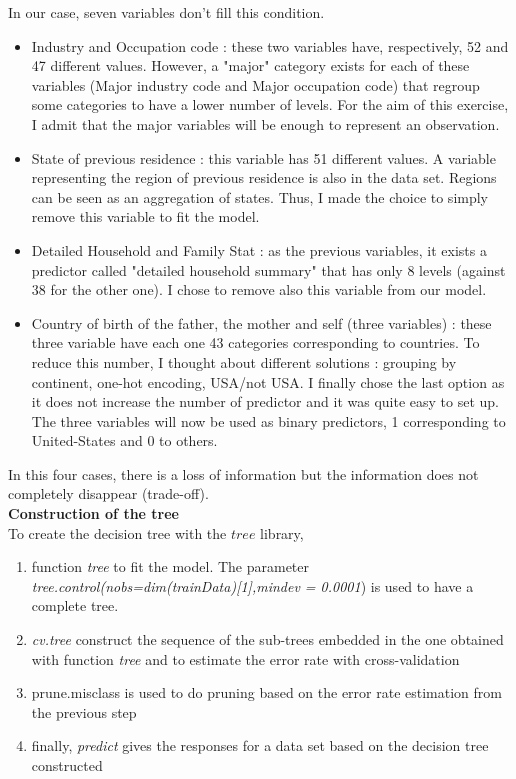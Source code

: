 \documentclass{article}
\begin{document}
\noindent In our case, seven variables don't fill this condition.
\begin{itemize}
    \item Industry and Occupation code : these two variables have, respectively, 52 and 47 different values. However, a "major" category exists for each of these variables (Major industry code and Major occupation code) that regroup some categories to have a lower number of levels. For the aim of this exercise, I admit that the major variables will be enough to represent an observation.
    \item State of previous residence : this variable has 51 different values. A variable representing the region of previous residence is also in the data set. Regions can be seen as an aggregation of states. Thus, I made the choice to simply remove this variable to fit the model. 
    \item Detailed Household and Family Stat : as the previous variables, it exists a predictor called "detailed household summary" that has only 8 levels (against 38 for the other one). I chose to remove also this variable from our model.
    \item Country of birth of the father, the mother and self (three variables) : these three variable have each one 43 categories corresponding to countries. To reduce this number, I thought about different solutions : grouping by continent, one-hot encoding, USA/not USA. I finally chose the last option as it does not increase the number of predictor and it was quite easy to set up. The three variables will now be used as binary predictors, 1 corresponding to United-States and 0 to others.
\end{itemize}

\noindent In this four cases, there is a loss of information but the information does not completely disappear (trade-off). \\

\noindent\textbf{Construction of the tree} \\

\noindent To create the decision tree with the $tree$ library, 
\begin{enumerate}
    \item function \textit{tree} to fit the model. The parameter \textit{tree.control(nobs=dim(trainData)[1],mindev = 0.0001}) is used to have a complete tree.
    \item \textit{cv.tree} construct the sequence of the sub-trees embedded in the one obtained with function \textit{tree} and to estimate the error rate with cross-validation
    \item prune.misclass is used to do pruning based on the error rate estimation from the previous step
    \item finally, \textit{predict} gives the responses for a data set based on the decision tree constructed 
\end{enumerate}
\end{document}
